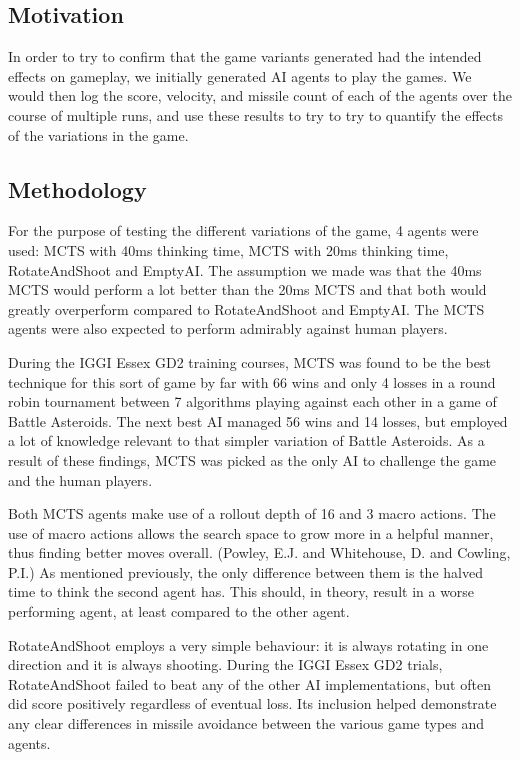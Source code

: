 \subsection{Motivation}
In order to try to confirm that the game variants generated had the intended effects on gameplay, we initially generated AI agents to play the games. We would then log the score, velocity, and missile count of each of the agents over the course of multiple runs, and use these results to try to try to quantify the effects of the variations in the game.

\subsection{Methodology}


For the purpose of testing the different variations of the game, 4 agents were used: MCTS with 40ms thinking time, MCTS with 20ms thinking time, RotateAndShoot and EmptyAI.
The assumption we made was that the 40ms MCTS would perform a lot better than the 20ms MCTS and that both would greatly overperform compared to RotateAndShoot and EmptyAI. The MCTS agents were also expected to perform admirably against human players.

During the IGGI Essex GD2 training courses, MCTS was found to be the best technique for this sort of game by far with 66 wins and only 4 losses in a round robin tournament between 7 algorithms playing against each other in a game of Battle Asteroids. The next best AI managed 56 wins and 14 losses, but employed a lot of knowledge relevant to that simpler variation of Battle Asteroids. As a result of these findings, MCTS was picked as the only AI to challenge the game and the human players.

Both MCTS agents make use of a rollout depth of 16 and 3 macro actions. The use of macro actions allows the search space to grow more in a helpful manner, thus finding better moves overall. ({Powley, E.J. and Whitehouse, D. and Cowling, P.I.}) As mentioned previously, the only difference between them is the halved time to think the second agent has. This should, in theory, result in a worse performing agent, at least compared to the other agent.

RotateAndShoot employs a very simple behaviour: it is always rotating in one direction and it is always shooting. During the IGGI Essex GD2 trials, RotateAndShoot failed to beat any of the other AI implementations, but often did score positively regardless of eventual loss. Its inclusion helped demonstrate any clear differences in missile avoidance between the various game types and agents.

